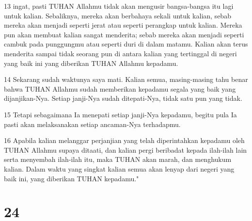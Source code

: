 \par 13 ingat, pasti TUHAN Allahmu tidak akan mengusir bangsa-bangsa itu lagi untuk kalian. Sebaliknya, mereka akan berbahaya sekali untuk kalian, sebab mereka akan menjadi seperti jerat atau seperti perangkap untuk kalian. Mereka pun akan membuat kalian sangat menderita; sebab mereka akan menjadi seperti cambuk pada punggungmu atau seperti duri di dalam matamu. Kalian akan terus menderita sampai tidak seorang pun di antara kalian yang tertinggal di negeri yang baik ini yang diberikan TUHAN Allahmu kepadamu.
\par 14 Sekarang sudah waktunya saya mati. Kalian semua, masing-masing tahu benar bahwa TUHAN Allahmu sudah memberikan kepadamu segala yang baik yang dijanjikan-Nya. Setiap janji-Nya sudah ditepati-Nya, tidak satu pun yang tidak.
\par 15 Tetapi sebagaimana Ia menepati setiap janji-Nya kepadamu, begitu pula Ia pasti akan melaksanakan setiap ancaman-Nya terhadapmu.
\par 16 Apabila kalian melanggar perjanjian yang telah diperintahkan kepadamu oleh TUHAN Allahmu supaya ditaati, dan kalian pergi beribadat kepada ilah-ilah lain serta menyembah ilah-ilah itu, maka TUHAN akan marah, dan menghukum kalian. Dalam waktu yang singkat kalian semua akan lenyap dari negeri yang baik ini, yang diberikan TUHAN kepadamu."

\chapter{24}

